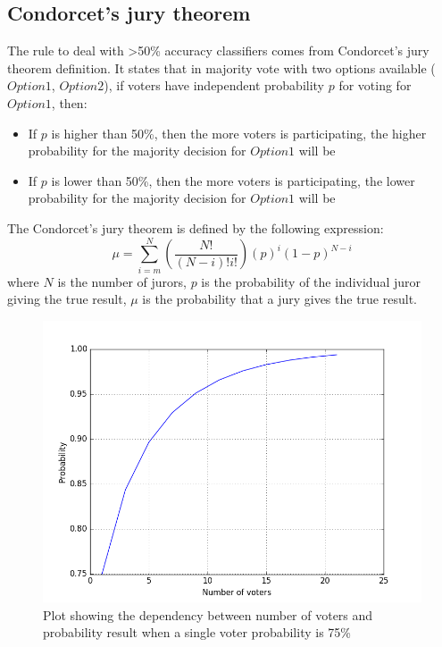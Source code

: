 \documentclass[12pt]{article}
\begin{document}
\subsection{Condorcet's jury theorem}
The rule to deal with >50\% accuracy classifiers comes from Condorcet's jury theorem definition. It states that in majority vote with two options available ($Option1$, $Option2$), if voters have independent probability $p$ for voting for $Option1$, then:
\begin{itemize}
\item If $p$ is higher than 50\%, then the more voters is participating, the higher probability for the majority decision for $Option1$ will be
\item If $p$ is lower than 50\%, then the more voters is participating, the lower probability for the majority decision for $Option1$ will be
\end{itemize}
The Condorcet's jury theorem is defined by the following expression:
\[ \mu = \sum_{i=m}^{N} (\frac{N!}{(N-i)!i!})(p)^i(1-p)^{N-i} \]
where $N$ is the number of jurors, $p$ is the probability of the individual juror giving the true result, $\mu$ is the probability that a jury gives the true result.
\begin{figure} [H]
\begin{center}
\includegraphics[width=1\textwidth]{condorcet}
\caption{Plot showing the dependency between number of voters and probability result when a single voter probability is 75\%}
\label{fig:condorcet}
\end{center}
\end{figure}
\end{document}
